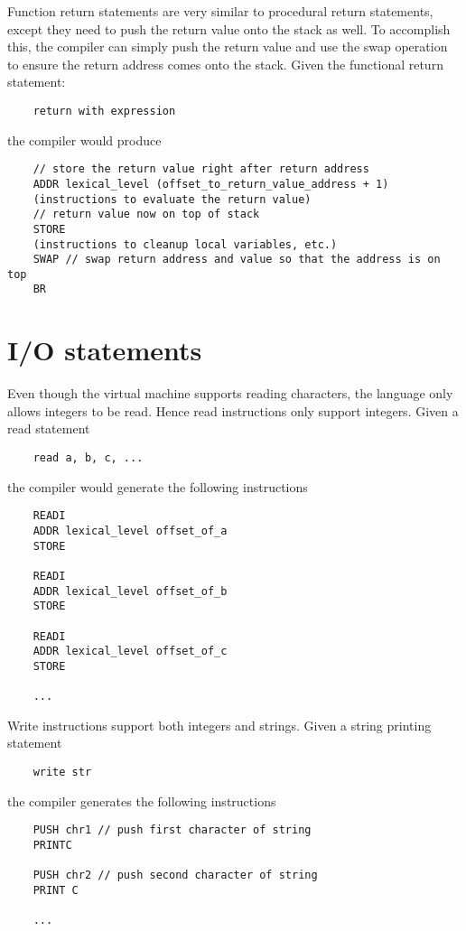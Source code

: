 \documentclass{article}
\begin{document}
\noindent
Function return statements are very similar to procedural return statements, except they need to push the return value onto the stack as well. To accomplish this, the compiler can simply push the return value and use the swap operation to ensure the return address comes onto the stack.
\newline
\newline
Given the functional return statement:
\begin{lstlisting}
    return with expression
\end{lstlisting}
the compiler would produce
\begin{lstlisting}
    // store the return value right after return address
    ADDR lexical_level (offset_to_return_value_address + 1)
    (instructions to evaluate the return value)
    // return value now on top of stack
    STORE
    (instructions to cleanup local variables, etc.)
    SWAP // swap return address and value so that the address is on top
    BR
\end{lstlisting}

\newpage
\section{I/O statements}

Even though the virtual machine supports reading characters, the language only allows integers to be read. Hence read instructions only support integers.
\newline
\newline
Given a read statement
\begin{lstlisting}
    read a, b, c, ...
\end{lstlisting}
the compiler would generate the following instructions
\begin{lstlisting}
    READI
    ADDR lexical_level offset_of_a
    STORE
    
    READI
    ADDR lexical_level offset_of_b
    STORE
    
    READI
    ADDR lexical_level offset_of_c
    STORE
    
    ...
\end{lstlisting}

\noindent
Write instructions support both integers and strings.
\newline
\newline
Given a string printing statement
\begin{lstlisting}
    write str
\end{lstlisting}
the compiler generates the following instructions
\begin{lstlisting}
    PUSH chr1 // push first character of string
    PRINTC
    
    PUSH chr2 // push second character of string
    PRINT C
    
    ...
\end{lstlisting}
\end{document}
